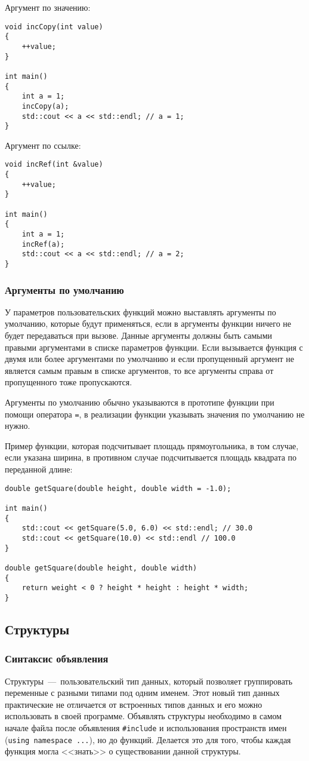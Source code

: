Аргумент по значению:
\begin{lstlisting}
void incCopy(int value)
{
    ++value;
}

int main()
{
    int a = 1;
    incCopy(a);
    std::cout << a << std::endl; // a = 1;
}
\end{lstlisting}

Аргумент по ссылке:
\begin{lstlisting}
void incRef(int &value)
{
    ++value;
}

int main()
{
    int a = 1;
    incRef(a);
    std::cout << a << std::endl; // a = 2;
}
\end{lstlisting}

\subsubsection{Аргументы по умолчанию}
У параметров пользовательских функций можно выставлять аргументы по умолчанию, которые будут применяться, если в аргументы функции ничего не будет передаваться при вызове. Данные аргументы должны быть самыми правыми аргументами в списке параметров функции. Если вызывается функция с двумя или более аргументами по умолчанию и если пропущенный аргумент не является самым правым в списке аргументов, то все аргументы справа от пропущенного тоже пропускаются.

Аргументы по умолчанию обычно указываются в прототипе функции при помощи оператора \lstinline|=|, в реализации функции указывать значения по умолчанию не нужно.

Пример функции, которая подсчитывает площадь прямоугольника, в том случае, если указана ширина, в противном случае подсчитывается площадь квадрата по переданной длине:

\begin{lstlisting}
double getSquare(double height, double width = -1.0);

int main()
{
    std::cout << getSquare(5.0, 6.0) << std::endl; // 30.0
    std::cout << getSquare(10.0) << std::endl // 100.0
}

double getSquare(double height, double width)
{
    return weight < 0 ? height * height : height * width;
}
\end{lstlisting}

\subsection{Структуры}
\subsubsection{Синтаксис объявления}
Структуры~---~пользовательский тип данных, который позволяет группировать переменные с разными типами под одним именем. Этот новый тип данных практические не отличается от встроенных типов данных и его можно использовать в своей программе. Объявлять структуры необходимо в самом начале файла после объявления \lstinline|#include| и использования пространств имен (\lstinline|using namespace ...|), но до функций. Делается это для того, чтобы каждая функция могла <<знать>> о существовании данной структуры.

